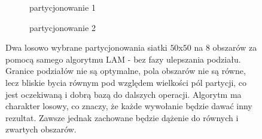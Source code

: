 \begin{figure}[h]
\centering
\begin{subfigure}{.5\textwidth}
    \centering
    \caption[short]{partycjonowanie 1}
\end{subfigure}%
\begin{subfigure}{.5\textwidth}
    \centering
    \caption[short]{partycjonowanie 2}
\end{subfigure}
\caption{Dwa losowo wybrane partycjonowania siatki $50$x$50$ na $8$ obszarów za pomocą samego algorytmu LAM - bez fazy ulepszania podziału.
    Granice podziałów nie są optymalne, pola obszarów nie są równe, lecz bliskie bycia równym pod względem wielkości pól partycji, co jest
    oczekiwaną i dobrą bazą do dalszych operacji. Algorytm ma charakter losowy, co znaczy, że każde wywołanie
    będzie dawać inny rezultat. Zawsze jednak zachowane będzie dążenie do równych i zwartych obszarów.}
\label{im:lam2}
\end{figure}

